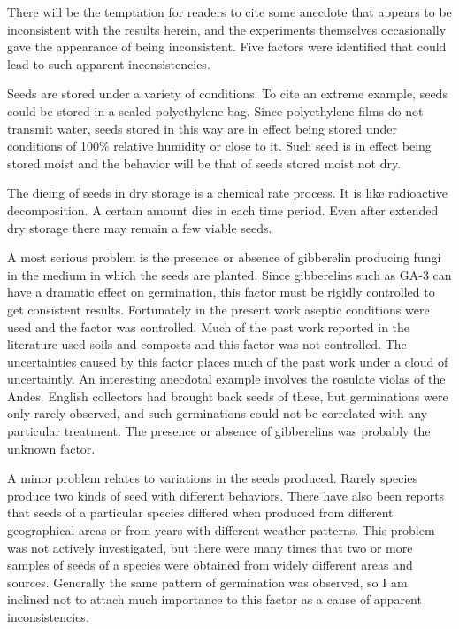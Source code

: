 There will be the temptation for readers to cite some anecdote that appears to
be inconsistent with the results herein, and the experiments themselves occasionally
gave the appearance of being inconsistent. Five factors were identified that could lead
to such apparent inconsistencies.

Seeds are stored under a variety of conditions. To cite an extreme example,
seeds could be stored in a sealed polyethylene bag. Since polyethylene films do not
transmit water, seeds stored in this way are in effect being stored under conditions of
100\% relative humidity or close to it. Such seed is in effect being stored moist and the
behavior will be that of seeds stored moist not dry.

The dieing of seeds in dry storage is a chemical rate process. It is like
radioactive decomposition. A certain amount dies in each time period. Even after
extended dry storage there may remain a few viable seeds.

A most serious problem is the presence or absence of gibberelin producing
fungi in the medium in which the seeds are planted. Since gibberelins such as GA-3
can have a dramatic effect on germination, this factor must be rigidly controlled to get
consistent results. Fortunately in the present work aseptic conditions were used and
the factor was controlled. Much of the past work reported in the literature used soils
and composts and this factor was not controlled. The uncertainties caused by this
factor places much of the past work under a cloud of uncertaintly. An interesting
anecdotal example involves the rosulate violas of the Andes. English collectors had
brought back seeds of these, but germinations were only rarely observed, and such
germinations could not be correlated with any particular treatment. The presence or
absence of gibberelins was probably the unknown factor.

A minor problem relates to variations in the seeds produced. Rarely species
produce two kinds of seed with different behaviors. There have also been reports that
seeds of a particular species differed when produced from different geographical
areas or from years with different weather patterns. This problem was not actively
investigated, but there were many times that two or more samples of seeds of a
species were obtained from widely different areas and sources. Generally the same
pattern of germination was observed, so I am inclined not to attach much importance to
this factor as a cause of apparent inconsistencies.


